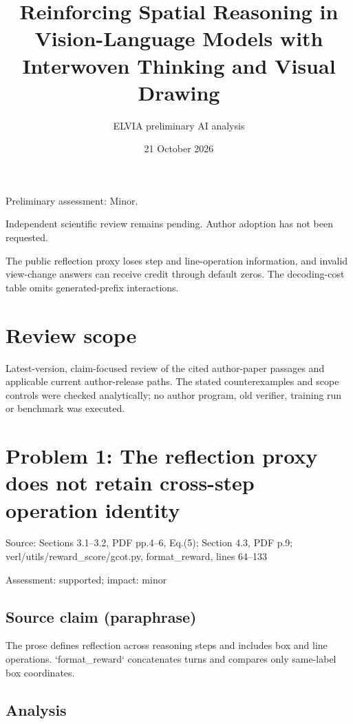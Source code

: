 \documentclass[11pt]{article}
\begin{document}
\title{Reinforcing Spatial Reasoning in Vision-Language Models with Interwoven Thinking and Visual Drawing}

\author{ELVIA preliminary AI analysis}\date{21 October 2026}\maketitle

Preliminary assessment: Minor.\par

Independent scientific review remains pending. Author adoption has not been requested.

The public reflection proxy loses step and line-operation information, and invalid view-change answers can receive credit through default zeros. The decoding-cost table omits generated-prefix interactions.

\section*{Review scope}

Latest-version, claim-focused review of the cited author-paper passages and applicable current author-release paths. The stated counterexamples and scope controls were checked analytically; no author program, old verifier, training run or benchmark was executed.

\section*{Problem 1: The reflection proxy does not retain cross-step operation identity}

Source: Sections 3.1–3.2, PDF pp.4–6, Eq.(5); Section 4.3, PDF p.9; verl/utils/reward\_score/gcot.py, format\_reward, lines 64–133

Assessment: supported; impact: minor

\subsection*{Source claim (paraphrase)}

The prose defines reflection across reasoning steps and includes box and line operations. `format\_reward` concatenates turns and compares only same-label box coordinates.

\subsection*{Analysis}
\end{document}
